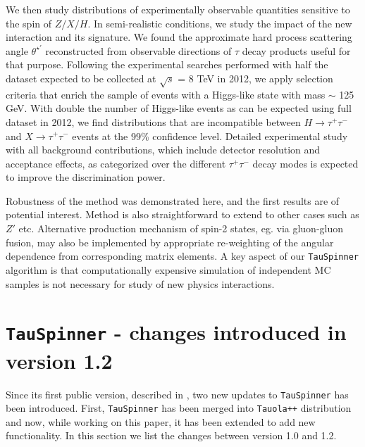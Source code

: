 \documentclass[12pt]{article}
\begin{document}
We then study distributions of experimentally observable quantities sensitive to the spin of $Z/X/H$.
In semi-realistic conditions, we study the impact of the new interaction and its signature. 
We found the approximate hard process scattering angle $\theta^{\star\prime}$ 
reconstructed from observable directions of $\tau$ decay products useful for that purpose.
Following the experimental searches performed with half the dataset expected to be collected at $\sqrt{s}$ = 8 TeV in 2012,
we apply selection criteria that enrich the sample of events with a Higgs-like state with mass $\sim$ 125 GeV.
With double the number of Higgs-like events as can be expected using full dataset in 2012, 
we find distributions that are incompatible between $H\to\tau^+\tau^-$ and $X\to\tau^+\tau^-$ events at the 99\% confidence level.
Detailed experimental study with all background contributions, which include detector resolution and acceptance effects, 
as categorized over the different $\tau^+\tau^-$ decay modes is expected to improve the discrimination power.

Robustness of the method was demonstrated here, and the first results are of potential interest. 
Method is also straightforward to extend to other cases such as $Z'$ etc. 
Alternative production mechanism of spin-2 states, eg. via gluon-gluon fusion, 
may also be implemented by appropriate re-weighting of the angular dependence from corresponding matrix elements.
A key aspect of our  {\tt TauSpinner} algorithm is that computationally expensive simulation 
of independent MC samples is not necessary for study of new physics interactions.

\appendix
\section{ {\tt TauSpinner} - changes introduced in version 1.2}
\label{sec:TauSpinnerChanges}
Since its first public version, described in \cite{Czyczula:2012ny}, two
new updates to {\tt TauSpinner} has been introduced. First, {\tt TauSpinner}
has been merged into {\tt Tauola++}\cite{Davidson:2010rw} distribution and now,
while working on this paper, it has been extended to add new functionality.
In this section we  list the changes between version 1.0 and 1.2.
\end{document}
